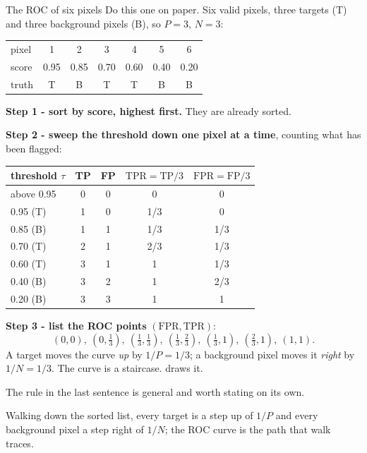 \begin{worked}[label={we:measures:six}]{The ROC of six pixels}
Do this one on paper. Six valid pixels, three targets (T) and three background pixels (B), so $P = 3$, $N = 3$:
\begin{center}
\begin{tabular}{lcccccc}
\toprule
pixel & 1 & 2 & 3 & 4 & 5 & 6 \\
score & 0.95 & 0.85 & 0.70 & 0.60 & 0.40 & 0.20 \\
truth & T & B & T & T & B & B \\
\bottomrule
\end{tabular}
\end{center}
\textbf{Step 1 - sort by score, highest first.} They are already sorted.

\textbf{Step 2 - sweep the threshold down one pixel at a time}, counting what has been flagged:
\begin{center}
\begin{tabular}{lcccc}
\toprule
threshold $\tau$ & TP & FP & $\mathrm{TPR} = \mathrm{TP}/3$ & $\mathrm{FPR} = \mathrm{FP}/3$ \\
\midrule
above 0.95 & 0 & 0 & 0 & 0 \\
0.95 (T) & 1 & 0 & 1/3 & 0 \\
0.85 (B) & 1 & 1 & 1/3 & 1/3 \\
0.70 (T) & 2 & 1 & 2/3 & 1/3 \\
0.60 (T) & 3 & 1 & 1 & 1/3 \\
0.40 (B) & 3 & 2 & 1 & 2/3 \\
0.20 (B) & 3 & 3 & 1 & 1 \\
\bottomrule
\end{tabular}
\end{center}
\textbf{Step 3 - list the ROC points} $(\mathrm{FPR}, \mathrm{TPR})$:
\[
(0,0),\ (0,\tfrac13),\ (\tfrac13,\tfrac13),\ (\tfrac13,\tfrac23),\ (\tfrac13,1),\ (\tfrac23,1),\ (1,1).
\]
A target moves the curve \emph{up} by $1/P = 1/3$; a background pixel moves it \emph{right} by $1/N = 1/3$. The
curve is a staircase.  draws it.
\end{worked}

The rule in the last sentence is general and worth stating on its own.

\begin{keypoint}
Walking down the sorted list, every target is a step up of $1/P$ and every background pixel a step right of $1/N$;
the ROC curve is the path that walk traces.
\end{keypoint}

